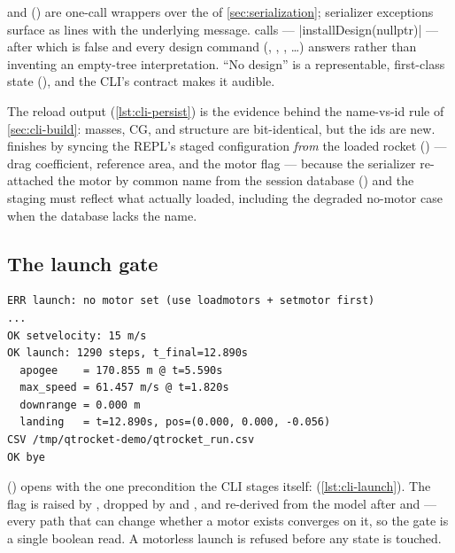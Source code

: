  and  () are one-call wrappers over the
 of \cref{sec:serialization}; serializer exceptions surface as 
lines with the underlying message.  calls
 --- \cppinline|installDesign(nullptr)| --- after which
 is false and every design command (, ,
, \dots) answers  rather than inventing an empty-tree
interpretation. ``No design'' is a representable, first-class state
(), and the CLI's contract makes it audible.

The reload output (\cref{lst:cli-persist}) is the evidence behind the name-vs-id rule of \cref{sec:cli-build}: masses, CG,
and structure are bit-identical, but the ids are new.  finishes by syncing the
REPL's staged configuration \emph{from} the loaded rocket () --- drag
coefficient, reference area, and the motor flag --- because the serializer re-attached the motor
by common name from the session database () and the
staging must reflect what actually loaded, including the degraded no-motor case when the database
lacks the name.

\subsection{The launch gate}\label{sec:cli-launch}

\begin{listing}[htbp]
\begin{verbatim}
ERR launch: no motor set (use loadmotors + setmotor first)
...
OK setvelocity: 15 m/s
OK launch: 1290 steps, t_final=12.890s
  apogee    = 170.855 m @ t=5.590s
  max_speed = 61.457 m/s @ t=1.820s
  downrange = 0.000 m
  landing   = t=12.890s, pos=(0.000, 0.000, -0.056)
CSV /tmp/qtrocket-demo/qtrocket_run.csv
OK bye
\end{verbatim}
\caption{The gate and the flight. The motorless  (issued mid-session, before
) is refused with the remedy in the message; the flight summary reads the
statistics tracked live during propagation and names the CSV written beside the
session.}\label{lst:cli-launch}
\end{listing}

 () opens with the one precondition the CLI stages itself:
 (\cref{lst:cli-launch}). The flag is raised by , dropped by  and
, and re-derived from the model after  and  ---
every path that can change whether a motor exists converges on it, so the gate is a single boolean
read. A motorless launch is refused before any state is touched.

